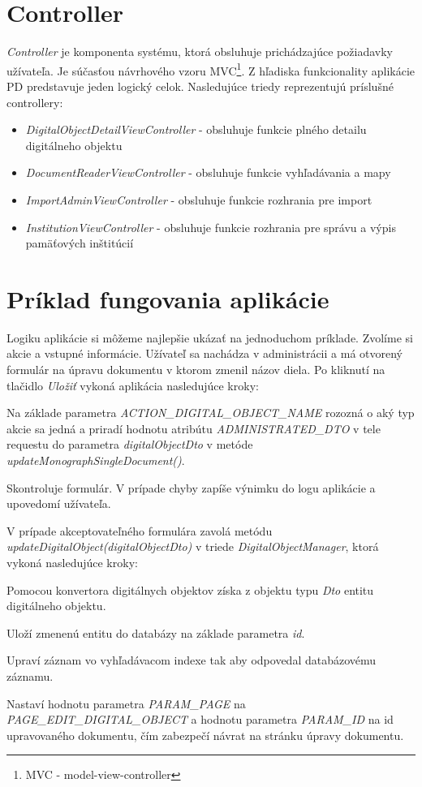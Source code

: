 \documentclass[
  print, %
  table,   %
  lof,     %
  nolot,     %
]{fithesis3}
\begin{document}
\section{Controller}
\textit{Controller} je komponenta systému, ktorá obsluhuje prichádzajúce požiadavky užívateľa. Je súčasťou návrhového vzoru MVC\footnote{MVC - model-view-controller}. Z hľadiska funkcionality aplikácie PD predstavuje jeden logický celok. Nasledujúce triedy reprezentujú príslušné controllery:
\begin{itemize}
	\item \textit{DigitalObjectDetailViewController} - obsluhuje funkcie plného detailu digitálneho objektu
	\item \textit{DocumentReaderViewController} - obsluhuje funkcie vyhľadávania a mapy
	\item \textit{ImportAdminViewController} - obsluhuje funkcie rozhrania pre import
	\item \textit{InstitutionViewController} - obsluhuje funkcie rozhrania pre správu a výpis pamäťových inštitúcií	
\end{itemize}
\section{Príklad fungovania aplikácie}
Logiku aplikácie si môžeme najlepšie ukázať na jednoduchom príklade. Zvolíme si akcie a vstupné informácie.  Užívateľ sa nachádza v administrácii a má otvorený formulár na úpravu dokumentu v ktorom zmenil názov diela. Po kliknutí na tlačidlo \textit{Uložiť} vykoná aplikácia nasledujúce kroky:
\begin{compactenum}
	\item Na základe parametra \textit{ACTION\_DIGITAL\_OBJECT\_NAME} rozozná o aký typ akcie sa jedná a priradí hodnotu atribútu \textit{ADMINISTRATED\_DTO} v tele requestu do parametra \textit{digitalObjectDto} v metóde \textit{updateMonographSingleDocument()}.
	\item Skontroluje formulár. V prípade chyby zapíše výnimku do logu aplikácie a upovedomí užívateľa.
	\item V prípade akceptovateľného formulára zavolá metódu \textit{updateDigitalObject(digitalObjectDto)} v triede \textit{DigitalObjectManager}, ktorá vykoná nasledujúce kroky:
	\begin{compactenum}
		\item Pomocou konvertora digitálnych objektov získa z objektu typu \textit{Dto} entitu digitálneho objektu.
		\item Uloží zmenenú entitu do databázy na základe parametra \textit{id}.
		\item Upraví záznam vo vyhľadávacom indexe tak aby odpovedal databázovému záznamu.		
	\end{compactenum} 
	\item Nastaví hodnotu parametra \textit{PARAM\_PAGE} na \textit{PAGE\_EDIT\_DIGITAL\_OBJECT} a hodnotu parametra \textit{PARAM\_ID} na id upravovaného dokumentu, čím zabezpečí návrat na stránku úpravy dokumentu.	 
\end{compactenum}
\end{document}
